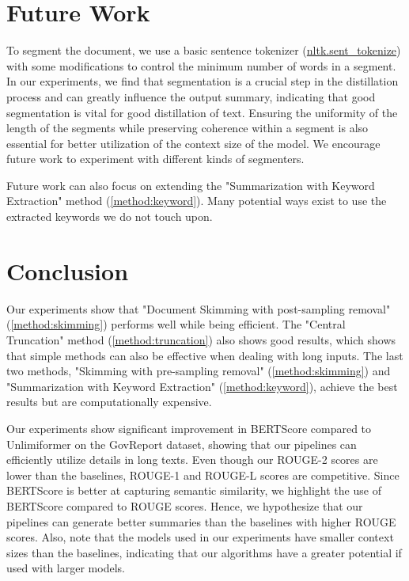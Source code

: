 \section{Future Work}
\label{sec:future-work}

To segment the document, we use a basic sentence tokenizer (\href{https://www.nltk.org/api/nltk.tokenize.sent_tokenize.html}{nltk.sent\_tokenize}) with some modifications to control the minimum number of words in a segment.
In our experiments, we find that segmentation is a crucial step in the distillation process and can greatly influence the output summary, indicating that good segmentation is vital for good distillation of text.
Ensuring the uniformity of the length of the segments while preserving coherence within a segment is also essential for better utilization of the context size of the model.
We encourage future work to experiment with different kinds of segmenters.

Future work can also focus on extending the "Summarization with Keyword Extraction" method (\autoref{method:keyword}).
Many potential ways exist to use the extracted keywords we do not touch upon.


\section{Conclusion}
\label{sec:conclusion}

Our experiments show that "Document Skimming with post-sampling removal" (\autoref{method:skimming}) performs well while being efficient.
The "Central Truncation" method (\autoref{method:truncation}) also shows good results, which shows that simple methods can also be effective when dealing with long inputs.
The last two methods, "Skimming with pre-sampling removal" (\autoref{method:skimming}) and "Summarization with Keyword Extraction" (\autoref{method:keyword}), achieve the best results but are computationally expensive.

Our experiments show significant improvement in BERTScore compared to Unlimiformer \cite{bertsch2023unlimiformer} on the GovReport dataset, showing that our pipelines can efficiently utilize details in long texts.
Even though our ROUGE-2 scores are lower than the baselines, ROUGE-1 and ROUGE-L scores are competitive.
Since BERTScore is better at capturing semantic similarity, we highlight the use of BERTScore compared to ROUGE scores.
Hence, we hypothesize that our pipelines can generate better summaries than the baselines with higher ROUGE scores.
Also, note that the models used in our experiments have smaller context sizes than the baselines, indicating that our algorithms have a greater potential if used with larger models.


